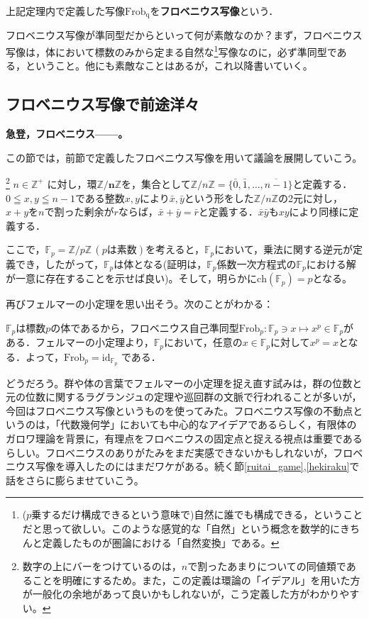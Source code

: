 \begin{dfn}[フロベニウス写像]\label{frob_def}
  上記定理内で定義した写像$\mathrm{Frob_q}$を\textbf{フロベニウス写像}という．
\end{dfn}

フロベニウス写像が準同型だからといって何が素敵なのか？まず，フロベニウス写像は，体において標数のみから定まる自然な\footnote{($p$乗するだけ構成できるという意味で)自然に誰でも構成できる，ということだと思って欲しい。このような感覚的な「自然」という概念を数学的にきちんと定義したものが圏論における「自然変換」である。}写像なのに，必ず準同型である，ということ。他にも素敵なことはあるが，これ以降書いていく。

\subsection{フロベニウス写像で前途洋々}
\textbf{急登，フロベニウス------。}

\vspace{10pt}

この節では，前節で定義したフロベニウス写像を用いて議論を展開していこう。

\begin{dfn}\footnote{数字の上にバーをつけているのは，$n$で割ったあまりについての同値類であることを明確にするため。また，この定義は環論の「イデアル」を用いた方が一般化の余地があって良いかもしれないが，こう定義した方がわかりやすい。}
  $n \in \mathbb{Z^{+}}$ に対し，環$\boldsymbol{ \mathbb{Z} /n \mathbb{Z}}$を，集合として$\mathbb{Z} /n \mathbb{Z} = \{\bar{0},\bar{1}, \dots ,\overline{n-1} \}$と定義する．$0\leqq x,y \leqq n-1$である整数$x,y$により$\bar{x},\bar{y}$という形をした$\mathbb{Z}/n\mathbb{Z}$の2元に対し，$x+y$を$n$で割った剰余が$r$ならば，$\bar{x}+\bar{y}=\bar{r}$と定義する．$\bar{x}\bar{y}$も$xy$により同様に定義する．
\end{dfn}

ここで，$\mathbb{F}_p=\mathbb{Z}/p\mathbb{Z} \,(pは素数)$を考えると，$\mathbb{F}_p$において，乗法に関する逆元が定義でき，したがって，$\mathbb{F}_p$は体となる(証明は，$\mathbb{F}_p$係数一次方程式の$\mathbb{F}_p$における解が一意に存在することを示せば良い)。そして，明らかに$\mathrm{ch}(\mathbb{F}_p)=p$となる。

再びフェルマーの小定理を思い出そう。次のことがわかる：

\begin{mybox}[フロベニウス写像の不動点]
  $\mathbb{F}_p$は標数$p$の体であるから，フロベニウス自己準同型$\mathrm{Frob}_p:\mathbb{F}_p\ni x\mapsto x^p\in \mathbb{F}_p$がある．フェルマーの小定理より，$\mathbb{F}_p$において，任意の$x\in \mathbb{F}_p$に対して$x^p=x$となる．よって，$\mathrm{Frob}_p=\mathrm{id}_{\mathbb{F}_p}$ である．
\end{mybox}
どうだろう。群や体の言葉でフェルマーの小定理を捉え直す試みは，群の位数と元の位数に関するラグランジュの定理や巡回群の文脈で行われることが多いが，今回はフロベニウス写像というものを使ってみた。フロベニウス写像の不動点というのは，「代数幾何学」においても中心的なアイデアであるらしく，有限体のガロワ理論を背景に，有理点をフロベニウスの固定点と捉える視点は重要であるらしい。フロベニウスのありがたみをまだ実感できないかもしれないが，フロベニウス写像を導入したのにはまだワケがある。続く節\ref{ruitai_game},\ref{hekiraku}で話をさらに膨らませていこう。